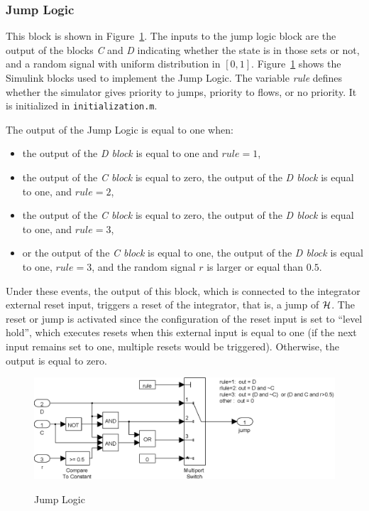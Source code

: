 \documentclass{article}
\begin{document}
\subsubsection{Jump Logic}

This block is shown in Figure~\ref{fig:JumpLogic}. The inputs to the jump logic block are the output of the blocks {\em C} and {\em D} indicating whether the state is in those sets or not, and a random signal with uniform distribution in $[0,1]$. Figure~\ref{fig:JumpLogic} shows the Simulink blocks used to implement the Jump Logic. The variable {\em rule} defines whether the simulator gives priority to jumps, priority to flows, or no priority. It is initialized in {\tt initialization.m}.

The output of the Jump Logic is equal to one when:
\begin{itemize}
\item the output of the {\em D block} is equal to one and $rule=1$,
\item the output of the {\em C block} is equal to zero, the output of the {\em D block} is equal to one, and $rule=2$,
\item the output of the {\em C block} is equal to zero, the output of the {\em D block} is equal to one, and $rule=3$,
\item or the output of the {\em C block} is equal to one, the output of the {\em D block} is equal to one, $rule = 3$, and the random signal $r$ is larger or equal than $0.5$.
\end{itemize}
Under these events, the output of this block, which is connected to the integrator external reset input, triggers a reset of the integrator, that is, a jump of $\mathcal{H}$. The reset or jump is activated since the configuration of the reset input is set to ``level hold'', which executes resets when this external input is equal to one (if the next input remains set to one, multiple resets would be triggered). Otherwise, the output is equal to zero.

\begin{figure}[ht]
  \begin{center}
    {\includegraphics[width=.8\textwidth]{figures/Simulink/JumpLogic.eps}}
   \caption{Jump Logic}
\label{fig:JumpLogic}
  \end{center}
\end{figure}
\end{document}
